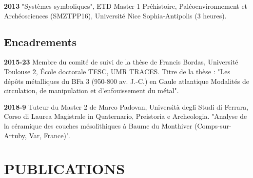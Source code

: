 \documentclass{article}
\newcommand{\fr}[1]{#1}       %
\newcommand{\en}[1]{}     %
\begin{document}
\smallbreak
\textbf{2013}
\fr{"Systèmes symboliques", ETD Master 1 Préhistoire, Paléoenvironnement et Archéosciences (SMZTPP16), Université Nice Sophia-Antipolis (3 heures).}
\en{"Symbolic Systems", ETD Master 1 in Prehistory, Paleoenvironment, and Archaeosciences (SMZTPP16), University of Nice Sophia-Antipolis (3 hours).}

\subsection*{\fr{Encadrements}\en{Supervisions}}

\textbf{2015-23}
\fr{Membre du comité de suivi de la thèse de Francis Bordas, Université Toulouse 2, École doctorale TESC, UMR TRACES. Titre de la thèse : "Les dépôts métalliques du BFa 3 (950-800 av. J.-C.) en Gaule atlantique Modalités de circulation, de manipulation et d’enfouissement du métal".}
\en{Member of the thesis monitoring committee for Francis Bordas, University of Toulouse 2, Doctoral School TESC, UMR TRACES. Thesis title: "Metallic deposits of BFa 3 (950-800 BC) in Atlantic Gaul: Modes of circulation, handling, and burial of metal".}

\smallbreak
\textbf{2018-9}
\fr{Tuteur du Master 2 de Marco Padovan, Università degli Studi di Ferrara, Corso di Laurea Magistrale in Quaternario, Preistoria e Archeologia. "Analyse de la céramique des couches mésolithiques à Baume du Monthiver (Comps-sur-Artuby, Var, France)".}
\en{Supervisor for the Master 2 of Marco Padovan, University of Ferrara, Master's Degree in Quaternary, Prehistory and Archaeology. "Analysis of the ceramics from the Mesolithic layers at Baume du Monthiver (Comps-sur-Artuby, Var, France)".}

\section{PUBLICATIONS}
\end{document}
